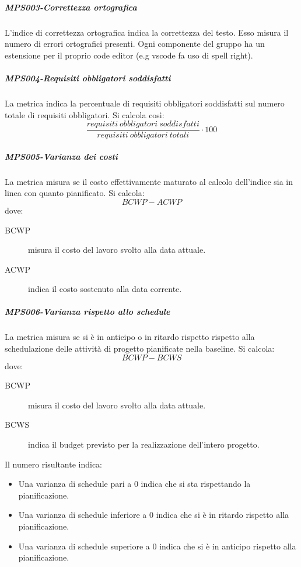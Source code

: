\documentclass[../norme-di-progetto.tex]{subfiles}
\begin{document}
\subparagraph{MPS003-Correttezza ortografica}%
\label{subp:MPS003-correttezza_ortografica}

L'indice di correttezza ortografica indica la correttezza del testo. Esso misura il numero di errori ortografici presenti. Ogni componente del gruppo ha un estensione per il proprio code editor (e.g vscode fa uso di spell right).

\subparagraph{MPS004-Requisiti obbligatori soddisfatti}%
\label{subp:MPS004-requisiti_obbligatori_soddisfatti}

La metrica indica la percentuale di requisiti obbligatori soddisfatti sul numero totale di requisiti obbligatori. Si calcola così:
\[
\frac{requisiti\ obbligatori\ soddisfatti}{requisiti\ obbligatori\ totali}\cdot 100
\]

\subparagraph{MPS005-Varianza dei costi}%
\label{subp:MPS005-varianza_dei_costi}

La metrica misura se il costo effettivamente maturato al calcolo dell'indice sia in linea con quanto pianificato. Si calcola:
\[
   BCWP-ACWP
\]
dove:
\begin{description}
  \item [BCWP] misura il costo del lavoro svolto alla data attuale.
  \item [ACWP] indica il costo sostenuto alla data corrente.
 \end{description}

\subparagraph{MPS006-Varianza rispetto allo schedule}%
\label{subp:MPS006-varianza_rispetto_allo_schedule}

La metrica misura se si è in anticipo o in ritardo rispetto rispetto alla schedulazione delle attività di progetto pianificate nella baseline. Si calcola:
\[
    BCWP - BCWS
\]
dove:
\begin{description}
  \item [BCWP] misura il costo del lavoro svolto alla data attuale.
  \item [BCWS] indica il budget previsto per la realizzazione dell'intero progetto.
\end{description}
Il numero risultante indica:
\begin{itemize}
  \item Una varianza di schedule pari a 0 indica che si sta rispettando la pianificazione.
  \item Una varianza di schedule inferiore a 0 indica che si è in ritardo rispetto alla pianificazione.
  \item Una varianza di schedule superiore a 0 indica che si è in anticipo rispetto alla pianificazione.
\end{itemize}
\end{document}
